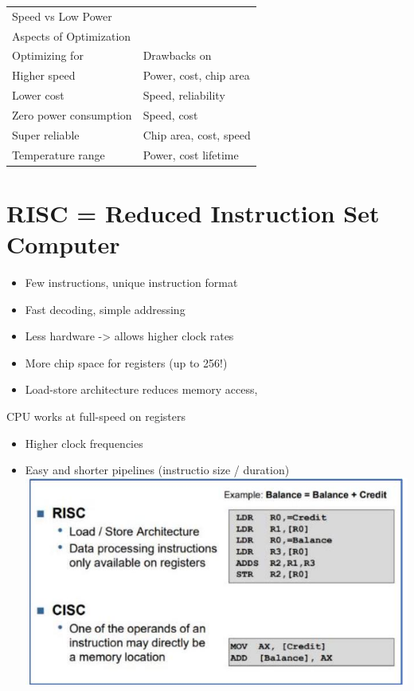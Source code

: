 \documentclass[10pt]{article}
\begin{document}
\begin{center}
\begin{tabular}{|l|l|}
\hline
Speed vs Low Power &  \\
Aspects of Optimization &  \\
\hline
Optimizing for & Drawbacks on \\
\hline
Higher speed & Power, cost, chip area \\
\hline
Lower cost & Speed, reliability \\
\hline
Zero power consumption & Speed, cost \\
\hline
Super reliable & Chip area, cost, speed \\
\hline
Temperature range & Power, cost lifetime \\
\hline
\end{tabular}
\end{center}

\section*{RISC = Reduced Instruction Set Computer}
\begin{itemize}
  \item Few instructions, unique instruction format
  \item Fast decoding, simple addressing
  \item Less hardware -> allows higher clock rates
  \item More chip space for registers (up to 256!)
  \item Load-store architecture reduces memory access,
\end{itemize}

CPU works at full-speed on registers

\begin{itemize}
  \item Higher clock frequencies
  \item Easy and shorter pipelines (instructio size / duration)\\
\includegraphics[max width=\textwidth, center]{2024_12_29_79e6b22f503fb7b4f718g-13(1)}
\end{itemize}
\end{document}
